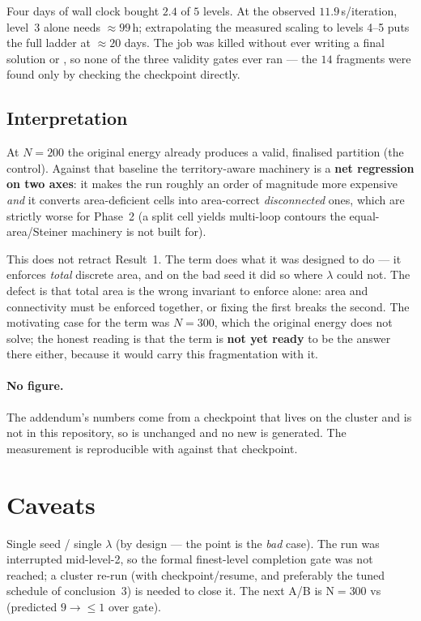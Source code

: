 \documentclass[11pt,a4paper]{article}
\begin{document}
Four days of wall clock bought \(2.4\) of \(5\) levels. At the observed
\(11.9\)\,s/iteration, level~3 alone needs \(\approx 99\)\,h; extrapolating the
measured scaling to levels 4--5 puts the full ladder at \(\approx 20\) days. The
job was killed without ever writing a final solution or , so
none of the three validity gates ever ran --- the \(14\) fragments were found only
by checking the checkpoint directly.

\subsection{Interpretation}
At \(N{=}200\) the original energy already produces a valid, finalised partition
(the control). Against that baseline the territory-aware machinery is a
\textbf{net regression on two axes}: it makes the run roughly an order of magnitude
more expensive \emph{and} it converts area-deficient cells into area-correct
\emph{disconnected} ones, which are strictly worse for Phase~2 (a split cell yields
multi-loop contours the equal-area/Steiner machinery is not built for).

This does not retract Result~1. The term does what it was designed to do --- it
enforces \emph{total} discrete area, and on the bad seed it did so where \(\lambda\)
could not. The defect is that total area is the wrong invariant to enforce alone:
area and connectivity must be enforced together, or fixing the first breaks the
second. The motivating case for the term was \(N{=}300\), which the original energy
does not solve; the honest reading is that the term is \textbf{not yet ready} to be
the answer there either, because it would carry this fragmentation with it.

\paragraph{No figure.} The addendum's numbers come from a checkpoint that lives on
the cluster and is not in this repository, so  is
unchanged and no new  is generated. The measurement is reproducible
with  against that checkpoint.

\section{Caveats}
Single seed / single \(\lambda\) (by design --- the point is the \emph{bad} case).
The run was interrupted mid-level-2, so the formal finest-level completion gate was
not reached; a cluster re-run (with checkpoint/resume, and preferably the tuned
schedule of conclusion~3) is needed to close it. The next A/B is N\(=\)300 vs
 (predicted \(9\to\le1\) over gate).
\end{document}
